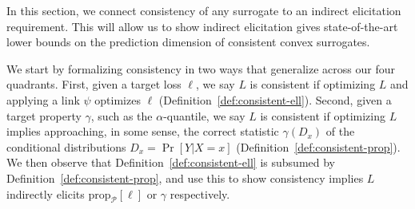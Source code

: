 \documentclass[11pt]{article} %
\newcommand{\Comments}{1}
\newcommand{\mytodo}[2]{\ifnum\Comments=1%
	\todo[linecolor=#1!80!black,backgroundcolor=#1,bordercolor=#1!80!black]{#2}\fi}
\newcommand{\jessiet}[1]{\mytodo{purple!20!white}{JF: #1}}
\newcommand{\prop}[2][\mathcal{P}]{\mathrm{prop}_{#1}[#2]}
\renewcommand{\L}{\mathcal{L}}
\begin{document}


In this section, we connect consistency of any surrogate to an indirect elicitation requirement.
This will allow us to show indirect elicitation gives state-of-the-art lower bounds on the prediction dimension of consistent convex surrogates.

We start by formalizing consistency in two ways that generalize across our four quadrants.
First, given a target loss $\ell$, we say $L$ is consistent if optimizing $L$ and applying a link $\psi$ optimizes $\ell$ (Definition~\ref{def:consistent-ell}).
Second, given a target property $\gamma$, such as the $\alpha$-quantile, we say $L$ is consistent if optimizing $L$ implies approaching, in some sense, the correct statistic $\gamma(D_x)$ of the conditional distributions $D_x = \Pr[Y|X=x]$ (Definition~\ref{def:consistent-prop}).
We then observe that Definition~\ref{def:consistent-ell} is subsumed by Definition~\ref{def:consistent-prop}, and use this to show consistency implies $L$ indirectly elicits $\prop{\ell}$ or $\gamma$ respectively.
\end{document}
